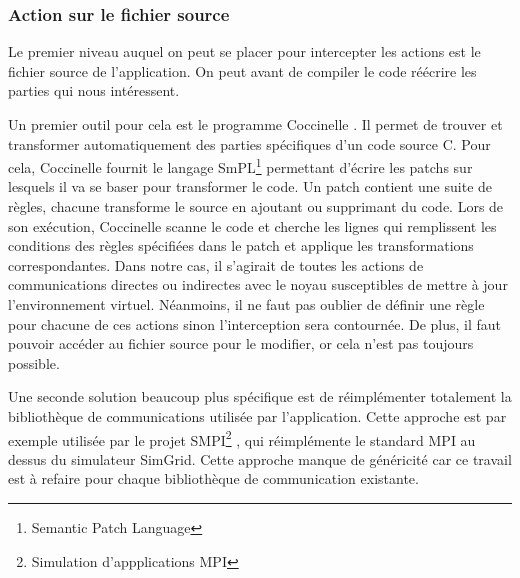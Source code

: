 \subsubsection{Action sur le fichier source}
\label{section:source}
Le premier niveau auquel on peut se placer pour intercepter les actions est le fichier source de l'application. On peut avant de compiler le code réécrire les parties qui nous intéressent.

Un premier outil pour cela est le programme Coccinelle \citep{cocci}. Il permet de trouver et transformer automatiquement des parties spécifiques d'un code source C. Pour cela, Coccinelle fournit le langage SmPL\footnote{Semantic Patch Language} permettant d'écrire les patchs sur lesquels il va se baser pour transformer le code. Un patch contient une suite de règles, chacune transforme le source en ajoutant ou supprimant du code. Lors de son exécution, Coccinelle scanne le code et cherche les lignes qui remplissent les conditions des règles spécifiées dans le patch et applique les transformations correspondantes. Dans notre cas, il s'agirait de toutes les actions de communications directes ou indirectes avec le noyau susceptibles de mettre à jour l'environnement virtuel. Néanmoins, il ne faut pas oublier de définir une règle pour chacune de ces actions sinon l'interception sera contournée. De plus, il faut pouvoir accéder au fichier source pour le modifier, or cela n'est pas toujours possible.

Une seconde solution beaucoup plus spécifique est de réimplémenter totalement la bibliothèque de communications utilisée par l'application. Cette approche est par exemple utilisée par le projet SMPI\footnote{Simulation d'appplications MPI} \citep{SMPI, clauss2011single}, qui réimplémente le standard MPI au dessus du simulateur SimGrid. Cette approche manque de  généricité car ce travail est à refaire pour chaque bibliothèque de communication existante. 

